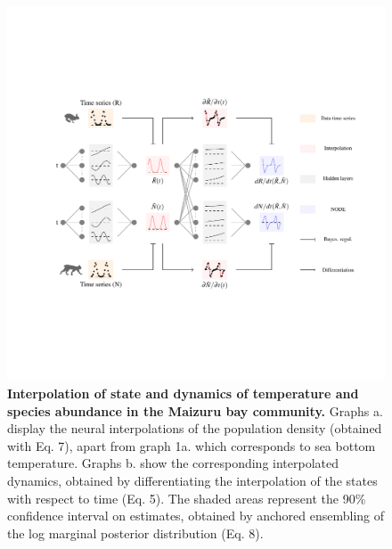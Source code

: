 \documentclass[11pt, oneside]{article}
\begin{document}
\begin{figure}[H]
\includegraphics[width=1\linewidth,page=27]{figures/main.pdf}
\caption{
    \textbf{Interpolation of state and dynamics of temperature and species abundance in the Maizuru bay community.}
    Graphs a. display the neural interpolations of the population density (obtained with Eq. 7), apart from graph 1a. which corresponds to sea bottom temperature. 
    Graphs b. show the corresponding interpolated dynamics, obtained by differentiating the interpolation of the states with respect to time (Eq. 5). 
    The shaded areas represent the 90\% confidence interval on estimates, obtained by anchored ensembling of the log marginal posterior distribution (Eq. 8).
}
\end{figure}
\newpage
\end{document}
